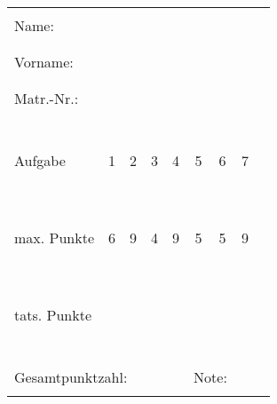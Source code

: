 \documentclass[12pt,twoside]{report}
\renewcommand{\#}[1]{\textup{\texttt{#1}}}
\begin{document}
\def\Q{\hspace*{12mm}}
\begin{center}
  \begin{tabular}[t]{|l|*{8}{c|}}
    \cline{1-5}
    \multicolumn{5}{|l|}{} \\
    \multicolumn{5}{|l|}{Name:} \\
    \multicolumn{5}{|l|}{} \\
    \cline{1-5}
    \multicolumn{5}{|l|}{} \\
    \multicolumn{5}{|l|}{Vorname:} \\
    \multicolumn{5}{|l|}{} \\
    \cline{1-5}
    \multicolumn{5}{|l|}{} \\
    \multicolumn{5}{|l|}{Matr.-Nr.:} \\
    \multicolumn{5}{|l|}{} \\
    \cline{1-5}
    \multicolumn{8}{c}{ } \\
    \cline{1-8}
    \            &   &   &   &   &   &   &      \\
    Aufgabe      & 1 & 2 & 3 & 4 & 5 & 6 & 7   \\
    \            & \Q& \Q& \Q& \Q& \Q& \Q& \Q  \\
    \cline{1-8}
    \            &   &   &   &   &   &   &      \\
    max. Punkte  & 6 & 9 & 4 & 9 & 5 & 5 & 9    \\
    \            &   &   &   &   &   &   &      \\
    \cline{1-8}
    \            &   &   &   &   &   &   &      \\
    tats. Punkte &   &   &   &   &   &   &      \\
    \            &   &   &   &   &   &   &      \\
  \cline{1-8}
    \multicolumn{8}{c}{ } \\
    \cline{1-4}\cline{6-7}
    \multicolumn{4}{|l|}{ } &
    \multicolumn{1}{c}{ } &
    \multicolumn{2}{|l|}{ } & \multicolumn{1}{c}{ }\\
    \multicolumn{4}{|l|}{Gesamtpunktzahl:} &
    \multicolumn{1}{c}{ } &
    \multicolumn{2}{|l|}{Note:} & \multicolumn{1}{c}{ }\\
    \multicolumn{4}{|l|}{ } &
    \multicolumn{1}{c}{ } &
    \multicolumn{2}{|l|}{ } & \multicolumn{1}{c}{ } \\
    \cline{1-4}\cline{6-7}
  \end{tabular}
\end{center}

\def\foobar{\relax}
\def\repeattm{0}

\end{document}

